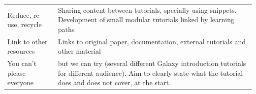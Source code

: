 \documentclass[10pt,letterpaper]{article}
\begin{document}
\begin{table}[!ht]
\begin{adjustwidth}{-2in}{0in}
\begin{tabular}{p{}p{}}
		Reduce, re-use, recycle                             & Sharing content between tutorials, specially using snippets. Development of small modular tutorials linked by learning paths \\
		Link to other resources                             & Links to original paper, documentation, external tutorials and other material \\
		You can't please everyone                           & but we can try (several different Galaxy introduction tutorials for different audience). Aim to clearly state what the tutorial does and does not cover, at the start.  \\
	\end{tabular}
	\end{adjustwidth}
\end{table}

\clearpage
\end{document}
